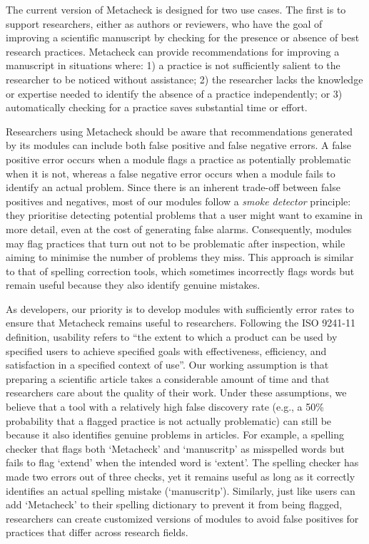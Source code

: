 \documentclass[
  letterpaper,
  12pt]{article}
\begin{document}
The current version of Metacheck is designed for two use cases. The
first is to support researchers, either as authors or reviewers, who
have the goal of improving a scientific manuscript by checking for the
presence or absence of best research practices. Metacheck can provide
recommendations for improving a manuscript in situations where: 1) a
practice is not sufficiently salient to the researcher to be noticed
without assistance; 2) the researcher lacks the knowledge or expertise
needed to identify the absence of a practice independently; or 3)
automatically checking for a practice saves substantial time or effort.

Researchers using Metacheck should be aware that recommendations
generated by its modules can include both false positive and false
negative errors. A false positive error occurs when a module flags a
practice as potentially problematic when it is not, whereas a false
negative error occurs when a module fails to identify an actual problem.
Since there is an inherent trade-off between false positives and
negatives, most of our modules follow a \emph{smoke detector} principle:
they prioritise detecting potential problems that a user might want to
examine in more detail, even at the cost of generating false alarms.
Consequently, modules may flag practices that turn out not to be
problematic after inspection, while aiming to minimise the number of
problems they miss. This approach is similar to that of spelling
correction tools, which sometimes incorrectly flags words but remain
useful because they also identify genuine mistakes.

As developers, our priority is to develop modules with sufficiently
error rates to ensure that Metacheck remains useful to researchers.
Following the ISO 9241-11 definition, usability refers to ``the extent
to which a product can be used by specified users to achieve specified
goals with effectiveness, efficiency, and satisfaction in a specified
context of use''. Our working assumption is that preparing a scientific
article takes a considerable amount of time and that researchers care
about the quality of their work. Under these assumptions, we believe
that a tool with a relatively high false discovery rate (e.g., a 50\%
probability that a flagged practice is not actually problematic) can
still be because it also identifies genuine problems in articles. For
example, a spelling checker that flags both `Metacheck' and `manuscritp'
as misspelled words but fails to flag `extend' when the intended word is
`extent'. The spelling checker has made two errors out of three checks,
yet it remains useful as long as it correctly identifies an actual
spelling mistake (`manuscritp'). Similarly, just like users can add
`Metacheck' to their spelling dictionary to prevent it from being
flagged, researchers can create customized versions of modules to avoid
false positives for practices that differ across research fields.
\end{document}
